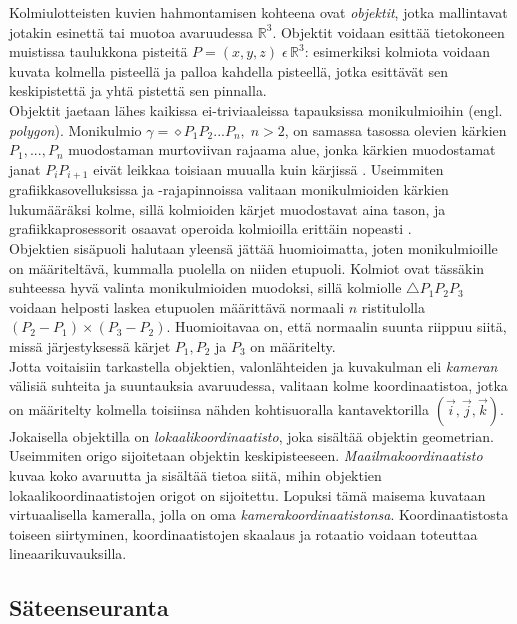 \documentclass[a4paper, 12pt, titlepage]{article}
\newcommand{\R}{\mathbb{R}}
\begin{document}
Kolmiulotteisten kuvien hahmontamisen kohteena ovat \emph{objektit}, jotka mallintavat jotakin esinettä tai muotoa avaruudessa $\R^3$. Objektit voidaan esittää tietokoneen muistissa taulukkona pisteitä $P=(x,y,z)\;\epsilon\,\R^3$: esimerkiksi kolmiota voidaan kuvata kolmella pisteellä ja palloa kahdella pisteellä, jotka esittävät sen keskipistettä ja yhtä pistettä sen pinnalla. \citep[.]{angel}\\

Objektit jaetaan lähes kaikissa ei-triviaaleissa tapauksissa monikulmioihin (engl. \emph{polygon}). Monikulmio $\gamma = \diamond P_1P_2...P_n, \; n > 2$, on samassa tasossa olevien kärkien $P_1,...,P_n$ muodostaman murtoviivan rajaama alue, jonka kärkien muodostamat janat $P_i P_{i+1}$ eivät leikkaa toisiaan muualla kuin kärjissä \citep{harju}. Useimmiten grafiikkasovelluksissa ja -rajapinnoissa valitaan monikulmioiden kärkien lukumääräksi kolme, sillä kolmioiden kärjet muodostavat aina tason, ja grafiikkaprosessorit osaavat operoida kolmioilla erittäin nopeasti \citep{angel}.\\

Objektien sisäpuoli halutaan yleensä jättää huomioimatta, joten monikulmioille on määriteltävä, kummalla puolella on niiden etupuoli. Kolmiot ovat tässäkin suhteessa hyvä valinta monikulmioiden muodoksi, sillä kolmiolle $\triangle P_1P_2P_3$ voidaan helposti laskea etupuolen määrittävä normaali $n$ ristitulolla $(P_2-P_1) \times (P_3-P_2)$. Huomioitavaa on, että normaalin suunta riippuu siitä, missä järjestyksessä kärjet $P_1, P_2$ ja $P_3$ on määritelty. \citep[.]{hughes}\\

Jotta voitaisiin tarkastella objektien, valonlähteiden ja kuvakulman eli \emph{kameran} välisiä suhteita ja suuntauksia avaruudessa, valitaan kolme koordinaatistoa, jotka on määritelty kolmella toisiinsa nähden kohtisuoralla kantavektorilla $(\vec{i},\vec{j},\vec{k})$. Jokaisella objektilla on \emph{lokaalikoordinaatisto}, joka sisältää objektin geometrian. Useimmiten origo sijoitetaan objektin keskipisteeseen. \emph{Maailmakoordinaatisto} kuvaa koko avaruutta ja sisältää tietoa siitä, mihin objektien lokaalikoordinaatistojen origot on sijoitettu. Lopuksi tämä maisema kuvataan virtuaalisella kameralla, jolla on oma \emph{kamerakoordinaatistonsa}. Koordinaatistosta toiseen siirtyminen, koordinaatistojen skaalaus ja rotaatio voidaan toteuttaa lineaarikuvauksilla. \citep[.]{janke}

\subsection{Säteenseuranta}
\end{document}
